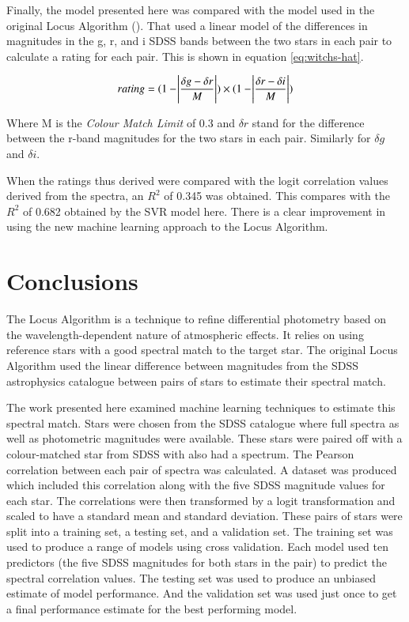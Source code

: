 \documentclass[preprint, 3p,
authoryear]{elsarticle} %
\begin{document}
Finally, the model presented here was compared with the model used in
the original Locus Algorithm (\citet{Creaner2021}). That used a linear
model of the differences in magnitudes in the g, r, and i SDSS bands
between the two stars in each pair to calculate a rating for each pair.
This is shown in equation \ref{eq:witchs-hat}.

\begin{equation}
rating =(1- \abs{\frac{\delta g - \delta r}{M}}) \times (1-\abs{\frac{\delta r - \delta i}{M}})
  \label{eq:witchs-hat}
\end{equation}

Where M is the \emph{Colour Match Limit} of 0.3 and \(\delta r\) stand
for the difference between the r-band magnitudes for the two stars in
each pair. Similarly for \(\delta g\) and \(\delta i\).

When the ratings thus derived were compared with the logit correlation
values derived from the spectra, an \(R^2\) of 0.345 was obtained. This
compares with the \(R^2\) of 0.682 obtained by the SVR model here. There
is a clear improvement in using the new machine learning approach to the
Locus Algorithm.

\hypertarget{conclusions}{%
\section{Conclusions}\label{conclusions}}

The Locus Algorithm is a technique to refine differential photometry
based on the wavelength-dependent nature of atmospheric effects. It
relies on using reference stars with a good spectral match to the target
star. The original Locus Algorithm used the linear difference between
magnitudes from the SDSS astrophysics catalogue between pairs of stars
to estimate their spectral match.

The work presented here examined machine learning techniques to estimate
this spectral match. Stars were chosen from the SDSS catalogue where
full spectra as well as photometric magnitudes were available. These
stars were paired off with a colour-matched star from SDSS with also had
a spectrum. The Pearson correlation between each pair of spectra was
calculated. A dataset was produced which included this correlation along
with the five SDSS magnitude values for each star. The correlations were
then transformed by a logit transformation and scaled to have a standard
mean and standard deviation. These pairs of stars were split into a
training set, a testing set, and a validation set. The training set was
used to produce a range of models using cross validation. Each model
used ten predictors (the five SDSS magnitudes for both stars in the
pair) to predict the spectral correlation values. The testing set was
used to produce an unbiased estimate of model performance. And the
validation set was used just once to get a final performance estimate
for the best performing model.
\end{document}
